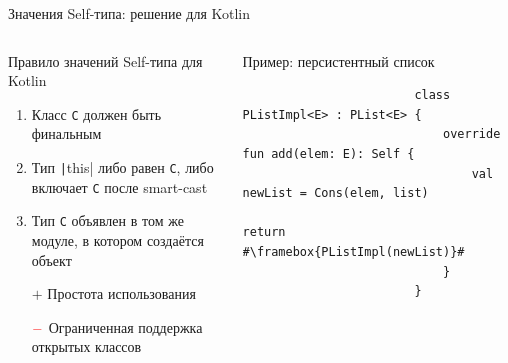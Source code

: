\documentclass[usenames, dvipsnames]{beamer}
\begin{document}
\begin{frame}[fragile]{Значения Self-типа: решение для Kotlin}
        \begin{columns}[onlytextwidth]
            \begin{column}{0.485\textwidth}
                \begin{block}{Правило значений Self-типа для Kotlin}
                    \begin{enumerate}
                        \item Класс \texttt{C} должен быть финальным
                        \item Тип \texttt|this|
                        либо равен \texttt{С}, либо включает \texttt{C} после smart-cast
                        \item Тип \texttt{C} объявлен в том же модуле, в котором создаётся объект
                    \end{enumerate}
                \end{block}
                \begin{block}{}
                    \begin{itemize}
                        \item[$+$] Простота использования
                        \item[$\color{red} -$] Ограниченная поддержка открытых классов
                    \end{itemize}
                \end{block}
            \end{column}\hfill%
            \begin{column}{0.485\textwidth}
                \begin{block}{Пример: персистентный список}
                    \begin{verbatim}
                        class PListImpl<E> : PList<E> {
                            override fun add(elem: E): Self {
                                val newList = Cons(elem, list)
                                return #\framebox{PListImpl(newList)}#
                            }
                        }
                    \end{verbatim}
                \end{block}
            \end{column}
        \end{columns}
    \end{frame}
\end{document}
